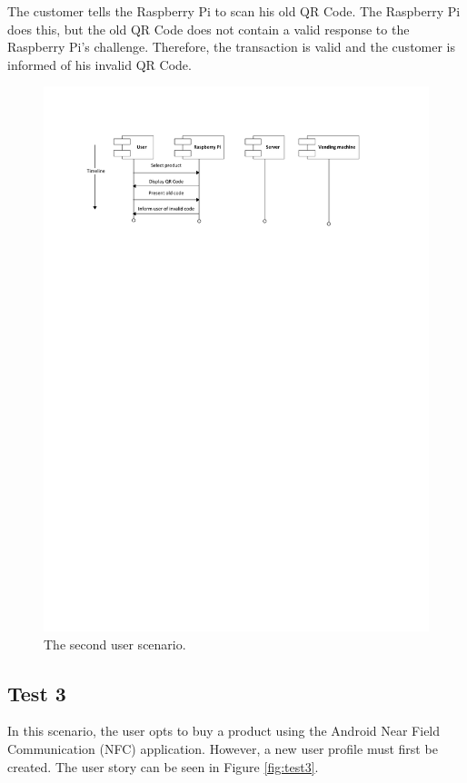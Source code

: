 The customer tells the Raspberry Pi to scan his old QR Code. The Raspberry Pi does
this, but the old QR Code does not contain a valid response to the Raspberry Pi's
challenge. Therefore, the transaction is valid and the customer is informed of his
invalid QR Code.

\begin{figure}
 \centering 
 \includegraphics[clip=true, trim = 0 620 0 50,
 scale=0.7]{user_story_2}
 \caption{The second user scenario.}
 \label{fig:test2}
\end{figure}

\subsection{Test 3}

In this scenario, the user opts to buy a product using the Android Near Field
Communication (NFC) application. However, a new user profile must first be created. The user story
can be seen in Figure \ref{fig:test3}.

